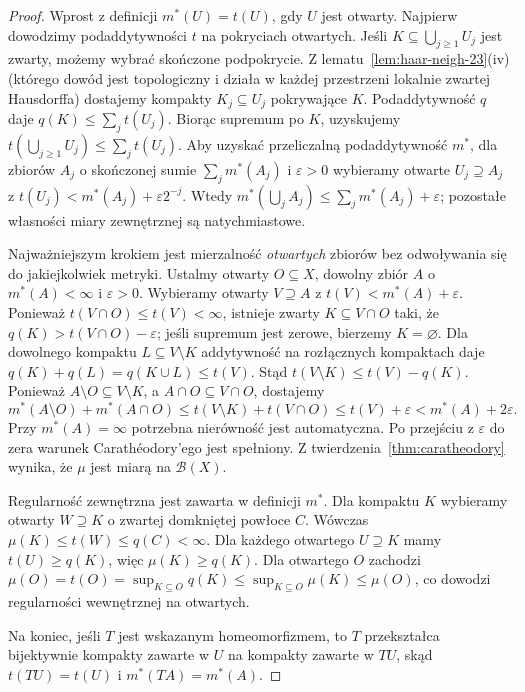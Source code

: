 \documentclass[11pt,a4paper,oneside]{book}
\numberwithin{equation}{chapter}
\theoremstyle{plain}
\theoremstyle{definition}
\theoremstyle{remark}
\begin{document}
\begin{proof}
Wprost z definicji $m^*(U)=t(U)$, gdy $U$ jest otwarty.
Najpierw dowodzimy podaddytywności $t$ na pokryciach
otwartych. Jeśli $K\subseteq\bigcup_{j\ge1}U_j$ jest
zwarty, możemy wybrać skończone podpokrycie.
Z lematu~\ref{lem:haar-neigh-23}(iv) (którego dowód
jest topologiczny i działa w każdej przestrzeni lokalnie
zwartej Hausdorffa) dostajemy kompakty
$K_j\subseteq U_j$ pokrywające $K$. Podaddytywność $q$
daje $q(K)\le\sum_jt(U_j)$. Biorąc supremum po $K$,
uzyskujemy
$t(\bigcup_{j\ge1}U_j)\le\sum_jt(U_j)$.
Aby uzyskać przeliczalną podaddytywność $m^*$,
dla zbiorów $A_j$ o skończonej sumie $\sum_jm^*(A_j)$
i $\varepsilon>0$ wybieramy otwarte $U_j\supseteq A_j$
z $t(U_j)<m^*(A_j)+\varepsilon2^{-j}$.
Wtedy $m^*(\bigcup_jA_j)\le\sum_jm^*(A_j)+\varepsilon$;
pozostałe własności miary zewnętrznej są natychmiastowe.

Najważniejszym krokiem jest mierzalność \emph{otwartych}
zbiorów bez odwoływania się do jakiejkolwiek metryki.
Ustalmy otwarty $O\subseteq X$, dowolny zbiór $A$
o $m^*(A)<\infty$ i $\varepsilon>0$.
Wybieramy otwarty $V\supseteq A$ z
$t(V)<m^*(A)+\varepsilon$. Ponieważ
$t(V\cap O)\le t(V)<\infty$, istnieje zwarty
$K\subseteq V\cap O$ taki, że
$q(K)>t(V\cap O)-\varepsilon$; jeśli supremum
jest zerowe, bierzemy $K=\varnothing$.
Dla dowolnego kompaktu $L\subseteq V\setminus K$
addytywność na rozłącznych kompaktach daje
$q(K)+q(L)=q(K\cup L)\le t(V)$.
Stąd $t(V\setminus K)\le t(V)-q(K)$.
Ponieważ $A\setminus O\subseteq V\setminus K$,
a $A\cap O\subseteq V\cap O$, dostajemy
\[
 m^*(A\setminus O)+m^*(A\cap O)
 \le t(V\setminus K)+t(V\cap O)
 \le t(V)+\varepsilon<m^*(A)+2\varepsilon.
\]
Przy $m^*(A)=\infty$ potrzebna nierówność
jest automatyczna. Po przejściu z $\varepsilon$ do
zera warunek Carathéodory'ego jest spełniony.
Z twierdzenia~\ref{thm:caratheodory} wynika,
że $\mu$ jest miarą na $\mathcal B(X)$.

Regularność zewnętrzna jest zawarta w definicji $m^*$.
Dla kompaktu $K$ wybieramy otwarty $W\supseteq K$
o zwartej domkniętej powłoce $C$. Wówczas
$\mu(K)\le t(W)\le q(C)<\infty$.
Dla każdego otwartego $U\supseteq K$ mamy
$t(U)\ge q(K)$, więc $\mu(K)\ge q(K)$.
Dla otwartego $O$ zachodzi
$\mu(O)=t(O)=\sup_{K\subseteq O}q(K)
\le\sup_{K\subseteq O}\mu(K)\le\mu(O)$,
co dowodzi regularności wewnętrznej na otwartych.

Na koniec, jeśli $T$ jest wskazanym homeomorfizmem,
to $T$ przekształca bijektywnie kompakty zawarte w $U$
na kompakty zawarte w $TU$, skąd
$t(TU)=t(U)$ i $m^*(TA)=m^*(A)$.
\end{proof}
\end{document}
